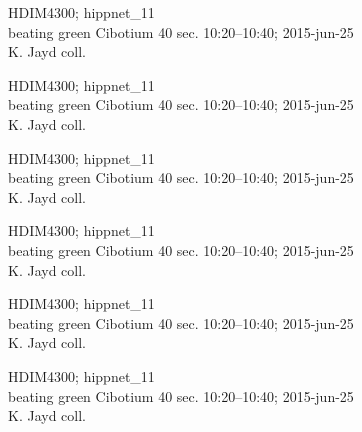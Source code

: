 \documentclass[2pt]{extarticle}
\begin{document}
\noindent
\parbox{0.16\textwidth}{\tiny \raggedright \rule[-0.3\baselineskip]{0pt}{10pt}HDIM4300; hippnet\_11\\ beating green Cibotium 40 sec. 10:20--10:40; 2015-jun-25\\ K. Jayd coll.}
\parbox{0.16\textwidth}{\tiny \raggedright \rule[-0.3\baselineskip]{0pt}{10pt}HDIM4300; hippnet\_11\\ beating green Cibotium 40 sec. 10:20--10:40; 2015-jun-25\\ K. Jayd coll.}
\parbox{0.16\textwidth}{\tiny \raggedright \rule[-0.3\baselineskip]{0pt}{10pt}HDIM4300; hippnet\_11\\ beating green Cibotium 40 sec. 10:20--10:40; 2015-jun-25\\ K. Jayd coll.}
\parbox{0.16\textwidth}{\tiny \raggedright \rule[-0.3\baselineskip]{0pt}{10pt}HDIM4300; hippnet\_11\\ beating green Cibotium 40 sec. 10:20--10:40; 2015-jun-25\\ K. Jayd coll.}
\parbox{0.16\textwidth}{\tiny \raggedright \rule[-0.3\baselineskip]{0pt}{10pt}HDIM4300; hippnet\_11\\ beating green Cibotium 40 sec. 10:20--10:40; 2015-jun-25\\ K. Jayd coll.}
\parbox{0.16\textwidth}{\tiny \raggedright \rule[-0.3\baselineskip]{0pt}{10pt}HDIM4300; hippnet\_11\\ beating green Cibotium 40 sec. 10:20--10:40; 2015-jun-25\\ K. Jayd coll.} \\ 
\vspace{0.001in} 
\end{document}
